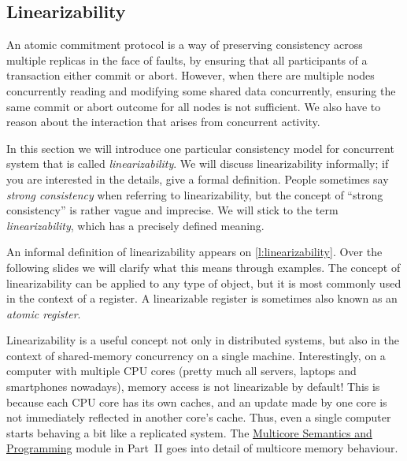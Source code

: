 \subsection{Linearizability}\label{sec:linearizability}

An atomic commitment protocol is a way of preserving consistency across multiple replicas in the face of faults, by ensuring that all participants of a transaction either commit or abort.
However, when there are multiple nodes concurrently reading and modifying some shared data concurrently, ensuring the same commit or abort outcome for all nodes is not sufficient.
We also have to reason about the interaction that arises from concurrent activity.

In this section we will introduce one particular consistency model for concurrent system that is called \emph{linearizability}.
We will discuss linearizability informally; if you are interested in the details, \cite{Herlihy:1990} give a formal definition.
People sometimes say \emph{strong consistency} when referring to linearizability, but the concept of ``strong consistency'' is rather vague and imprecise.
We will stick to the term \emph{linearizability}, which has a precisely defined meaning.

An informal definition of linearizability appears on \autoref{l:linearizability}.
Over the following slides we will clarify what this means through examples.
The concept of linearizability can be applied to any type of object, but it is most commonly used in the context of a register.
A linearizable register is sometimes also known as an \emph{atomic register}.

Linearizability is a useful concept not only in distributed systems, but also in the context of shared-memory concurrency on a single machine.
Interestingly, on a computer with multiple CPU cores (pretty much all servers, laptops and smartphones nowadays), memory access is not linearizable by default!
This is because each CPU core has its own caches, and an update made by one core is not immediately reflected in another core's cache.
Thus, even a single computer starts behaving a bit like a replicated system.
The \href{\multicore}{Multicore Semantics and Programming} module in Part~II goes into detail of multicore memory behaviour.

